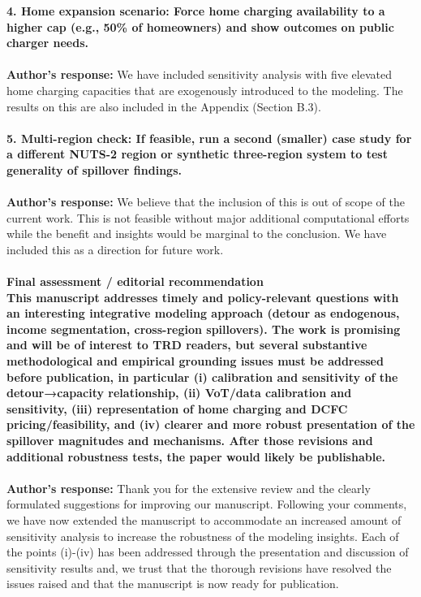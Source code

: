 \documentclass[11pt]{article}
\begin{document}
\color{reviewergrey}
\textbf{4. Home expansion scenario: Force home charging availability to a higher cap (e.g., 50\% of homeowners) and show outcomes on public charger needs.} \\ \\
\color{authorblue}\noindent \textcolor{authorblue}{\textbf{Author's response:}} We have included sensitivity analysis with five elevated home charging capacities that are exogenously introduced to the modeling. The results on this are also included in the Appendix (Section B.3).\\\\
\color{reviewergrey}
\textbf{5. Multi-region check: If feasible, run a second (smaller) case study for a different NUTS-2 region or synthetic three-region system to test generality of spillover findings.}\\\\
\color{authorblue}
\noindent \textcolor{authorblue}{\textbf{Author's response:}} We believe that the inclusion of this is out of scope of the current work. This is not feasible without major additional computational efforts while the benefit and insights would be marginal to the conclusion. We have included this as a direction for future work. \\\\
\color{reviewergrey}
\textbf{Final assessment / editorial recommendation\\
This manuscript addresses timely and policy-relevant questions with an interesting integrative modeling approach (detour as endogenous, income segmentation, cross-region spillovers). The work is promising and will be of interest to TRD readers, but several substantive methodological and empirical grounding issues must be addressed before publication, in particular (i) calibration and sensitivity of the detour→capacity relationship, (ii) VoT/data calibration and sensitivity, (iii) representation of home charging and DCFC pricing/feasibility, and (iv) clearer and more robust presentation of the spillover magnitudes and mechanisms. After those revisions and additional robustness tests, the paper would likely be publishable.} \\\\
\color{authorblue}
\noindent \textcolor{authorblue}{\textbf{Author's response:}}  Thank you for the extensive review and the clearly formulated suggestions for improving our manuscript. Following your comments, we have now extended the manuscript to accommodate an increased amount of sensitivity analysis to increase the robustness of the modeling insights. Each of the points (i)-(iv) has been addressed through the presentation and discussion of sensitivity results and, we trust that the thorough revisions have resolved the issues raised and that the manuscript is now ready for publication. 
\newpage
{}
\color{reviewergrey}
\end{document}
